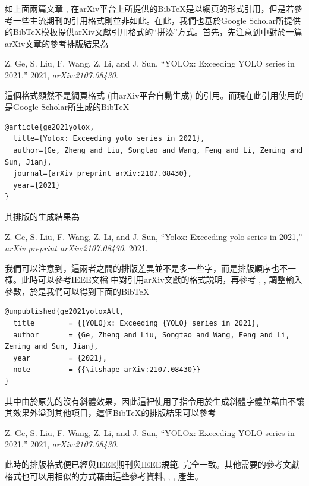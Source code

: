 \documentclass[12pt]{report}
\theoremstyle{plain}
\begin{document}
如上面兩篇文章 \cite{redmon2016lookonceunifiedrealtime}, \cite{vaswani2023attentionneed} 在arXiv平台上所提供的BibTeX是以網頁的形式引用，但是若參考一些主流期刊的引用格式\cite{wang2024yolov8}則並非如此。在此，我們也基於Google Scholar所提供的BibTeX模板提供arXiv文獻引用格式的``拼湊''方式。首先，先注意到\cite{wang2024yolov8}中對於一篇arXiv文章\cite{ge2021yolox}的參考排版結果為
\begin{mdframed}
Z. Ge, S. Liu, F. Wang, Z. Li, and J. Sun, “YOLOx: Exceeding YOLO series in 2021,” 2021, \textit{arXiv:2107.08430}.
\end{mdframed}
這個格式顯然不是網頁格式 (由arXiv平台自動生成) 的引用。而現在此引用\cite{ge2021yolox}使用的是Google Scholar所生成的BibTeX
\begin{lstlisting}
@article{ge2021yolox,
  title={Yolox: Exceeding yolo series in 2021},
  author={Ge, Zheng and Liu, Songtao and Wang, Feng and Li, Zeming and Sun, Jian},
  journal={arXiv preprint arXiv:2107.08430},
  year={2021}
}
\end{lstlisting}
其排版的生成結果為
\begin{mdframed}
Z. Ge, S. Liu, F. Wang, Z. Li, and J. Sun, “Yolox: Exceeding yolo series in 2021,” \textit{arXiv preprint arXiv:2107.08430}, 2021.
\end{mdframed}
我們可以注意到，這兩者之間的排版差異並不是多一些字，而是排版順序也不一樣。此時可以參考IEEE文檔 \cite{ieeerefguide} 中對引用arXiv文獻的格式説明，再參考 \cite{ieeebib}, \cite{bibtex}, \cite{bibtexsty} 調整輸入參數，於是我們可以得到下面的BibTeX
\begin{lstlisting}
@unpublished{ge2021yoloxAlt,
  title        = {{YOLO}x: Exceeding {YOLO} series in 2021},
  author       = {Ge, Zheng and Liu, Songtao and Wang, Feng and Li, Zeming and Sun, Jian},
  year         = {2021},
  note         = {{\itshape arXiv:2107.08430}}
}
\end{lstlisting}
其中由於原先的沒有斜體效果，因此這裡使用了指令用於生成斜體字體並藉由不讓其效果外溢到其他項目，這個BibTeX的排版結果可以參考\cite{ge2021yoloxAlt}
\begin{mdframed}
Z. Ge, S. Liu, F. Wang, Z. Li, and J. Sun, “YOLOx: Exceeding YOLO series in 2021,” 2021, \textit{arXiv:2107.08430}.
\end{mdframed}
此時的排版格式便已經與IEEE期刊\cite{wang2024yolov8}與IEEE規範\cite{ieeerefguide}, \cite{ieeebib}完全一致。其他需要的參考文獻格式也可以用相似的方式藉由這些參考資料\cite{ieeerefguide}, \cite{ieeebib}, \cite{bibtex}, \cite{bibtexsty} 產生。
\end{document}
